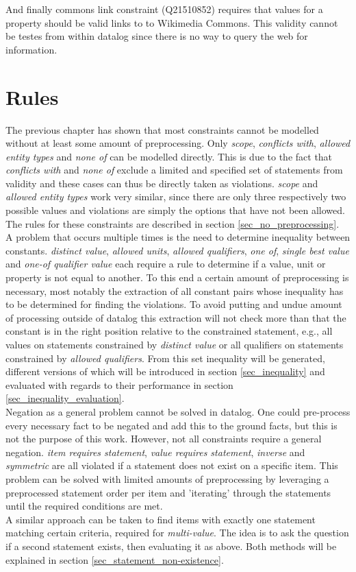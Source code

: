 \documentclass[hyperref,bachelorofscience,fleqn]{cgvpub}
\begin{document}
And finally commons link constraint (Q21510852) requires that values for a property should be valid links to to Wikimedia Commons. This validity cannot be testes from within datalog since there is no way to query the web for information.


\chapter{Rules}\label{cha_rules}
The previous chapter has shown that most constraints cannot be modelled without at least some amount of preprocessing. Only \emph{scope}, \emph{conflicts with}, \emph{allowed entity types} and \emph{none of} can be modelled directly. This is due to the fact that \emph{conflicts with} and \emph{none of} exclude a limited and specified set of statements from validity and these cases can thus be directly taken as violations. \emph{scope} and \emph{allowed entity types} work very similar, since there are only three respectively two possible values and violations are simply the options that have not been allowed. The rules for these constraints are described in section \ref{sec_no_preprocessing}.\\

A problem that occurs multiple times is the need to determine inequality between constants. \emph{distinct value}, \emph{allowed units}, \emph{allowed qualifiers}, \emph{one of}, \emph{single best value} and \emph{one-of qualifier value} each require a rule to determine if a value, unit or property is not equal to another. To this end a certain amount of preprocessing is necessary, most notably the extraction of all constant pairs whose inequality has to be determined for finding the violations. To avoid putting and undue amount of processing outside of datalog this extraction will not check more than that the constant is in the right position relative to the constrained statement, e.g., all values on statements constrained by \emph{distinct value} or all qualifiers on statements constrained by \emph{allowed qualifiers}. From this set inequality will be generated, different versions of which will be introduced in section \ref{sec_inequality} and evaluated with regards to their performance in section \ref{sec_inequality_evaluation}.\\

Negation as a general problem cannot be solved in datalog. One could pre-process every necessary fact to be negated and add this to the ground facts, but this is not the purpose of this work. However, not all constraints require a general negation. \emph{item requires statement}, \emph{value requires statement}, \emph{inverse }and \emph{symmetric} are all violated if a statement does not exist on a specific item. This problem can be solved with limited amounts of preprocessing by leveraging a preprocessed statement order per item and 'iterating' through the statements until the required conditions are met.\\
A similar approach can be taken to find items with exactly one statement matching certain criteria, required for 	\emph{multi-value}. The idea is to ask the question if a second statement exists, then evaluating it as above. Both methods will be explained in section \ref{sec_statement_non-existence}.
\end{document}
